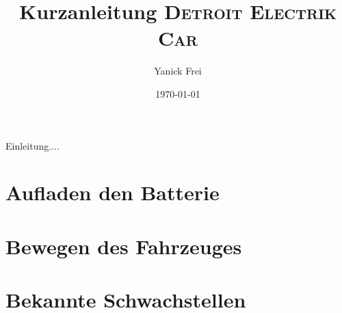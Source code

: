 \documentclass[a5paper]{fhnwreport}
\title{Kurzanleitung \textsc{Detroit Electrik Car}}
\author{Yanick Frei}
\date{\today}
\begin{document}
\maketitle

\newpage \newpage

Einleitung.... \newpage \newpage
\tableofcontents

\section{Aufladen den Batterie}

\section{Bewegen des Fahrzeuges}

\section{Bekannte Schwachstellen}
\end{document}

